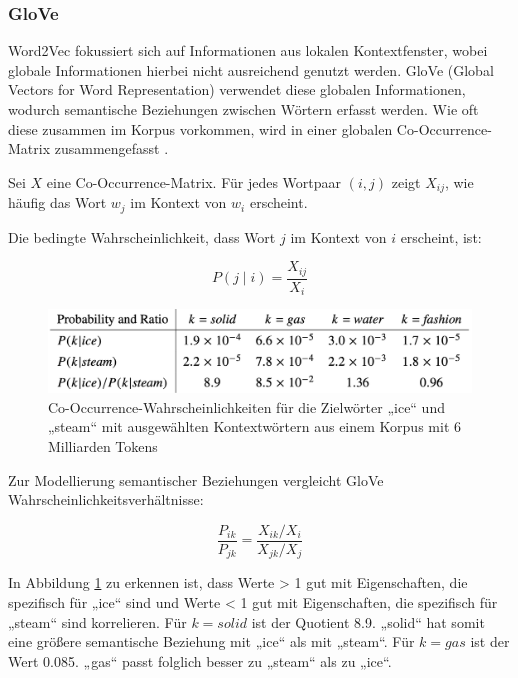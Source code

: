 \subsubsection{GloVe}

Word2Vec fokussiert sich auf Informationen aus lokalen Kontextfenster, wobei globale Informationen hierbei nicht ausreichend genutzt werden.
GloVe (Global Vectors for Word Representation) verwendet diese globalen Informationen, wodurch semantische Beziehungen zwischen Wörtern erfasst werden.
Wie oft diese zusammen im Korpus vorkommen, wird in einer globalen Co-Occurrence-Matrix zusammengefasst \cite{Wang:2020aa}.

Sei $X$ eine Co-Occurrence-Matrix.
Für jedes Wortpaar $(i, j)$ zeigt $X_{ij}$, wie häufig das Wort $w_j$ im Kontext von $w_i$ erscheint.

Die bedingte Wahrscheinlichkeit, dass Wort $j$ im Kontext von $i$ erscheint, ist:

\begin{equation}
    P(j \mid i) = \frac{X_{ij}}{X_i}
\end{equation}

\begin{figure}[htbp]
    \begin{center}
        \includegraphics[scale=0.3]{static/glove_matrix.png}
        \caption{\label{fig:glove_matrix} Co-Occurrence-Wahrscheinlichkeiten für die Zielwörter „ice“ und „steam“ mit ausgewählten Kontextwörtern aus einem Korpus mit 6 Milliarden Tokens \cite{pennington2014glove}}
    \end{center}
\end{figure}

Zur Modellierung semantischer Beziehungen vergleicht GloVe Wahrscheinlichkeitsverhältnisse:

\[
\frac{P_{ik}}{P_{jk}} = \frac{X_{ik} / X_i}{X_{jk} / X_j}
\]

In Abbildung \ref{fig:glove_matrix} zu erkennen ist, dass Werte > 1 gut mit Eigenschaften, die spezifisch für „ice“ sind
und Werte < 1 gut mit Eigenschaften, die spezifisch für „steam“ sind korrelieren.
Für $k=solid$ ist der Quotient 8.9. „solid“ hat somit eine größere semantische Beziehung mit „ice“ als mit „steam“.
Für $k=gas$ ist der Wert 0.085. „gas“ passt folglich besser zu „steam“ als zu „ice“.

